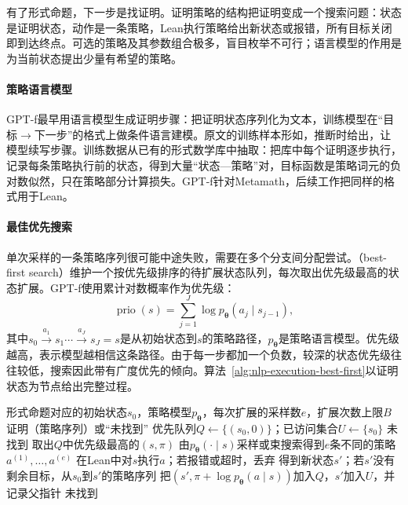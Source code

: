有了形式命题，下一步是找证明。证明策略的结构把证明变成一个搜索问题：状态是证明状态，动作是一条策略，Lean执行策略给出新状态或报错，所有目标关闭即到达终点。可选的策略及其参数组合极多，盲目枚举不可行；语言模型的作用是为当前状态提出少量有希望的策略。

\paragraph{策略语言模型}
GPT-f最早用语言模型生成证明步骤：把证明状态序列化为文本，训练模型在“目标$\to$下一步”的格式上做条件语言建模。原文的训练样本形如，推断时给出，让模型续写步骤。训练数据从已有的形式数学库中抽取：把库中每个证明逐步执行，记录每条策略执行前的状态，得到大量“状态—策略”对，目标函数是策略词元的负对数似然，只在策略部分计算损失。GPT-f针对Metamath，后续工作把同样的格式用于Lean。

\paragraph{最佳优先搜索}
单次采样的一条策略序列很可能中途失败，需要在多个分支间分配尝试。（best-first search）维护一个按优先级排序的待扩展状态队列，每次取出优先级最高的状态扩展。GPT-f使用累计对数概率作为优先级：
\begin{equation}
  \operatorname{prio}(s)=\sum_{j=1}^{J}\log p_{\bm\theta}(a_j\mid s_{j-1}),
  \label{eq:nlp-execution-proof-priority}
\end{equation}
其中$s_0\xrightarrow{a_1}s_1\cdots\xrightarrow{a_J}s_J=s$是从初始状态到$s$的策略路径，$p_{\bm\theta}$是策略语言模型。优先级越高，表示模型越相信这条路径。由于每一步都加一个负数，较深的状态优先级往往较低，搜索因此带有广度优先的倾向。算法~\ref{alg:nlp-execution-best-first}以证明状态为节点给出完整过程。

\begin{algorithm}[基于策略语言模型的最佳优先证明搜索]
  \label{alg:nlp-execution-best-first}
  \begin{algorithmic}[1]
    \Require 形式命题对应的初始状态$s_0$，策略模型$p_{\bm\theta}$，每次扩展的采样数$e$，扩展次数上限$B$
    \Ensure 证明（策略序列）或“未找到”
    \State 优先队列$Q\gets\{(s_0,0)\}$；已访问集合$U\gets\{s_0\}$
       \Return 未找到 \EndIf
      \State 取出$Q$中优先级最高的$(s,\pi)$
      \State 由$p_{\bm\theta}(\cdot\mid s)$采样或束搜索得到$e$条不同的策略$a^{(1)},\ldots,a^{(e)}$
        \State 在Lean中对$s$执行$a$；若报错或超时，丢弃
        \State 得到新状态$s'$；若$s'$没有剩余目标，\Return 从$s_0$到$s'$的策略序列
          \State 把$(s',\pi+\log p_{\bm\theta}(a\mid s))$加入$Q$，$s'$加入$U$，并记录父指针
        \EndIf
      \EndFor
    \EndFor
    \State \Return 未找到 
  \end{algorithmic}
\end{algorithm}

